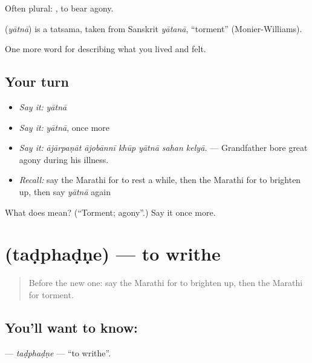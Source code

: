 Often plural:   , to bear agony.

\begin{cousinweb}
\textbf{} (\emph{yātnā}) is a tatsama, taken from Sanskrit \emph{yātanā}, \textquotedblleft{}torment\textquotedblright{} (Monier-Williams).
\end{cousinweb}

\begin{grammarlens}[title={What you've built}]
One more word for describing what you lived and felt.
\end{grammarlens}

\subsection*{Your turn}
\begin{itemize}
\raggedright
  \item \emph{Say it:} \emph{yātnā}
  \item \emph{Say it:} \emph{yātnā}, once more
  \item \emph{Say it:} \emph{ājārpaṇāt ājobānnī khūp yātnā sahan kelyā.} — Grandfather bore great agony during his illness.
  \item \emph{Recall:} say the Marathi for to rest a while, then the Marathi for to brighten up, then say \emph{yātnā} again
\end{itemize}

\begin{tcolorbox}[breakable,colback=teal!4,colframe=teal!35!black,title={Before you move on}]
What does  mean? (\textquotedblleft{}Torment; agony\textquotedblright{}.) Say it once more.
\end{tcolorbox}
\section[\texorpdfstring{\mr{तडफडणे} (taḍphaḍṇe)}{तडफडणे (taḍphaḍṇe)}]{ (taḍphaḍṇe) — to writhe}

\label{lesson:MR-C467-tadphadne}



\begin{quote}
Before the new one: say the Marathi for to brighten up, then the Marathi for torment.
\end{quote}

\subsection*{You'll want to know: }
\textbf{} — \emph{taḍphaḍṇe} — \textquotedblleft{}to writhe\textquotedblright{}.

